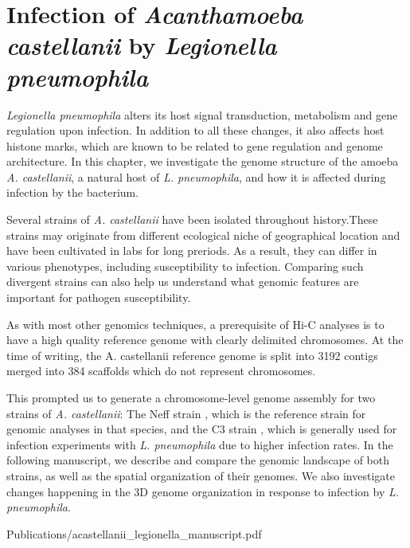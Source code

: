 
\chapter{Infection of \textit{Acanthamoeba castellanii} by \textit{Legionella pneumophila}} %

\label{ch:02-02} %


\textit{Legionella pneumophila} alters its host signal transduction, metabolism and gene regulation upon infection. In addition to all these changes, it also affects host histone marks, which are known to be related to gene regulation and genome architecture. In this chapter, we investigate the genome structure of the amoeba \textit{A. castellanii}, a natural host of \textit{L. pneumophila}, and how it is affected during infection by the bacterium.

Several strains of \textit{A. castellanii} have been isolated throughout history.These strains may originate from different ecological niche of geographical location and have been cultivated in labs for long preriods. As a result, they can differ in various phenotypes, including susceptibility to infection. Comparing such divergent strains can also help us understand what genomic features are important for pathogen susceptibility.

As with most other genomics techniques, a prerequisite of Hi-C analyses is to have a high quality reference genome with clearly delimited chromosomes. At the time of writing, the A. castellanii reference genome is split into 3192 contigs merged into 384 scaffolds which do not represent chromosomes.

This prompted us to generate a chromosome-level genome assembly for two strains of \textit{A. castellanii}: The Neff strain \cite{neffPurificationAxenicCultivation1957}, which is the reference strain for genomic analyses in that species, and the C3 strain \cite{michelIsolationAcanthamoebaStrain1997}, which is generally used for infection experiments with \textit{L. pneumophila} due to higher infection rates. In the following manuscript, we describe and compare the genomic landscape of both strains, as well as the spatial organization of their genomes. We also investigate changes happening in the 3D genome organization in response to infection by \textit{L. pneumophila}.


     {Publications/acastellanii_legionella_manuscript.pdf}    

